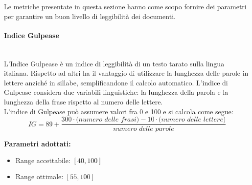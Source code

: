 Le metriche presentate in questa sezione hanno come scopo fornire dei parametri per garantire un buon livello di leggibilità dei documenti.

\paragraph{Indice Gulpease}\mbox{}\\[0,3cm]
L'Indice Gulpease è un indice di leggibilità di un testo tarato sulla lingua italiana. Rispetto ad altri ha il vantaggio di utilizzare la lunghezza delle parole in lettere anziché in sillabe, semplificandone il calcolo automatico.
L'indice di Gulpease considera due variabili linguistiche: la lunghezza della parola e la lunghezza della frase rispetto al numero delle lettere.\\[0,2cm]
L'indice di Gulpease può assumere valori fra 0 e 100 e si calcola come segue:
\[
IG = 89 + \frac{300 \cdot \textit{(numero delle frasi)} - 10 \cdot \textit{(numero delle lettere)}}{\textit{numero delle parole}}
\]

\textbf{Parametri adottati:}
\begin{itemize}
	\item Range accettabile: $[40 , 100]$
	\item Range ottimale: $[55 , 100]$
\end{itemize}
